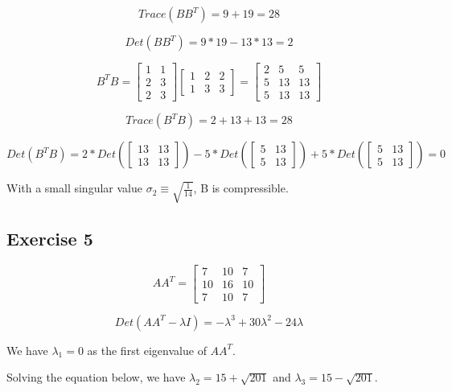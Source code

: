 \documentclass{article}
\begin{document}
\[
    Trace(BB^{T}) = 9 + 19 = 28
\]

\[
    Det(BB^{T}) = 9 * 19 - 13 * 13 = 2
\]

\[
    B^{T}B =
    \begin{bmatrix}
        1 & 1 \\
        2 & 3 \\
        2 & 3
    \end{bmatrix}
    \begin{bmatrix}
        1 & 2 & 2 \\
        1 & 3 & 3
    \end{bmatrix}
    = \begin{bmatrix}
        2 & 5  & 5  \\
        5 & 13 & 13 \\
        5 & 13 & 13
    \end{bmatrix}
\]

\[
    Trace(B^{T}B) = 2 + 13 + 13 = 28
\]

\[
    Det(B^{T}B) = 2 * Det(\begin{bmatrix} 13 & 13 \\ 13 & 13 \end{bmatrix}) - 5 * Det(\begin{bmatrix} 5 & 13 \\ 5 & 13 \end{bmatrix}) + 5 * Det(\begin{bmatrix} 5 & 13 \\ 5 & 13 \end{bmatrix}) = 0
\]

With a small singular value $\sigma_{2} \equiv \sqrt{\frac{1}{14}}$, B is compressible.

\subsection{Exercise 5}
\[
    AA^{T}=
    \begin{bmatrix}
        7  & 10 & 7  \\
        10 & 16 & 10 \\
        7  & 10 & 7
    \end{bmatrix}
\]

\[
    Det(AA^{T} - \lambda I) = -\lambda^{3} + 30 \lambda^{2} - 24\lambda
\]

We have $\lambda_{1} = 0$ as the first eigenvalue of $AA^{T}$.

Solving the equation below, we have $\lambda_{2} = 15 + \sqrt{201}$ and $\lambda_{3} = 15 - \sqrt{201}$.
\end{document}
